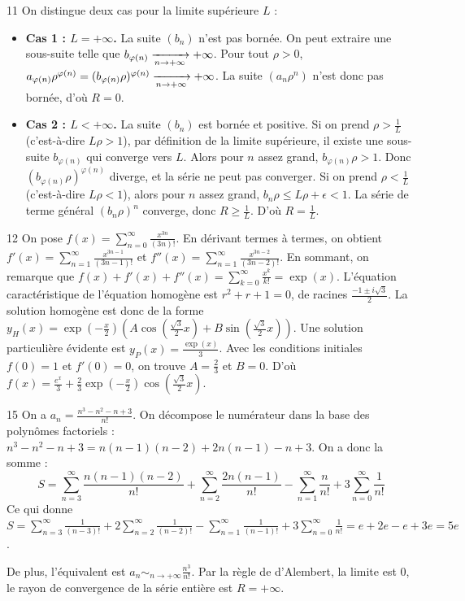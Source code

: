 \begin{correction}{11}
On distingue deux cas pour la limite supérieure $L$ : 
\begin{itemize}
 \item \textbf{Cas 1 : $L = +\infty$.} La suite $(b_n)$ n'est pas bornée. On peut extraire une sous-suite telle que $b_{\varphi(n)} \xrightarrow[n \to +\infty]{} +\infty$. 
 Pour tout $\rho > 0$, $a_{\varphi(n)}\rho^{\varphi(n)} = (b_{\varphi(n)}\rho)^{\varphi(n)} \xrightarrow[n \to +\infty]{} +\infty$. La suite $(a_n\rho^n)$ n'est donc pas bornée, d'où $R=0$. 
 \item \textbf{Cas 2 : $L < +\infty$.} La suite $(b_n)$ est bornée et positive. 
 Si on prend $\rho > \frac{1}{L}$ (c'est-à-dire $L\rho > 1$), par définition de la limite supérieure, il existe une sous-suite $b_{\varphi(n)}$ qui converge vers $L$. Alors pour $n$ assez grand, $b_{\varphi(n)}\rho > 1$. Donc $(b_{\varphi(n)}\rho)^{\varphi(n)}$ diverge, et la série ne peut pas converger. 
 Si on prend $\rho < \frac{1}{L}$ (c'est-à-dire $L\rho < 1$), alors pour $n$ assez grand, $b_n \rho \le L\rho + \epsilon < 1$. La série de terme général $(b_n \rho)^n$ converge, donc $R \ge \frac{1}{L}$. 
 D'où $R = \frac{1}{L}$. 
\end{itemize}
\end{correction}

\begin{correction}{12}
On pose $f(x) = \sum_{n=0}^\infty \frac{x^{3n}}{(3n)!}$. 
En dérivant termes à termes, on obtient $f'(x) = \sum_{n=1}^\infty \frac{x^{3n-1}}{(3n-1)!}$ et $f''(x) = \sum_{n=1}^\infty \frac{x^{3n-2}}{(3n-2)!}$. 
En sommant, on remarque que $f(x) + f'(x) + f''(x) = \sum_{k=0}^\infty \frac{x^k}{k!} = \exp(x)$. 
L'équation caractéristique de l'équation homogène est $r^2+r+1=0$, de racines $\frac{-1 \pm i\sqrt{3}}{2}$. 
La solution homogène est donc de la forme $y_H(x) = \exp\left(-\frac{x}{2}\right) \left(A \cos\left(\frac{\sqrt{3}}{2}x\right) + B \sin\left(\frac{\sqrt{3}}{2}x\right)\right)$. 
Une solution particulière évidente est $y_P(x) = \frac{\exp(x)}{3}$. 
Avec les conditions initiales $f(0)=1$ et $f'(0)=0$, on trouve $A = \frac{2}{3}$ et $B = 0$. 
D'où $f(x) = \frac{e^x}{3} + \frac{2}{3}\exp\left(-\frac{x}{2}\right)\cos\left(\frac{\sqrt{3}}{2}x\right)$. 
\end{correction}

\begin{correction}{15}
On a $a_n = \frac{n^3-n^2-n+3}{n!}$. 
On décompose le numérateur dans la base des polynômes factoriels : 
$n^3-n^2-n+3 = n(n-1)(n-2) + 2n(n-1) - n + 3$. 
On a donc la somme :
$$ S = \sum_{n=3}^\infty \frac{n(n-1)(n-2)}{n!} + \sum_{n=2}^\infty \frac{2n(n-1)}{n!} - \sum_{n=1}^\infty \frac{n}{n!} + 3\sum_{n=0}^\infty \frac{1}{n!} $$ 
Ce qui donne $S = \sum_{n=3}^\infty \frac{1}{(n-3)!} + 2\sum_{n=2}^\infty \frac{1}{(n-2)!} - \sum_{n=1}^\infty \frac{1}{(n-1)!} + 3\sum_{n=0}^\infty \frac{1}{n!} = e + 2e - e + 3e = 5e$. 

De plus, l'équivalent est $a_n \sim_{n \to +\infty} \frac{n^3}{n!}$. 
Par la règle de d'Alembert, la limite est 0, le rayon de convergence de la série entière est $R = +\infty$. 
\end{correction}

